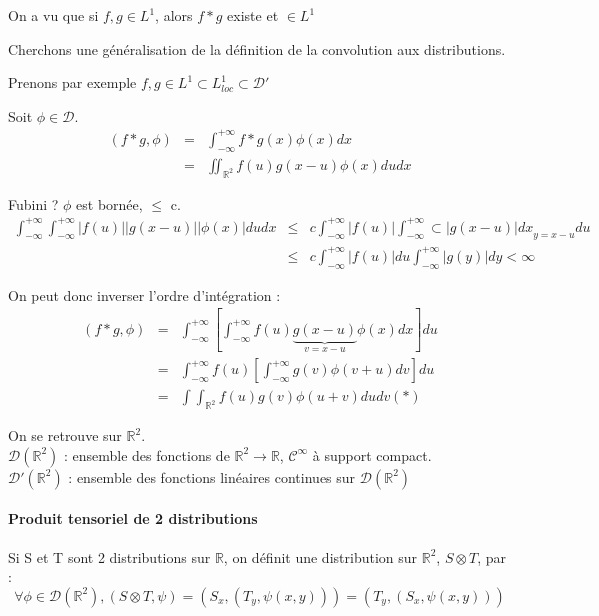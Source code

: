 \documentclass{article}
\begin{document}
On a vu que si $f,g\in L^1$, alors $f*g$ existe et $\in L^1$

Cherchons une généralisation de la définition de la convolution aux distributions.

Prenons par exemple $f,g\in L^1\subset L^1_{loc} \subset \mathcal{D}'$

Soit $\phi\in\mathcal{D}$.
\begin{eqnarray*}
(f*g,\phi)&=& \int_{-\infty}^{+\infty} f*g(x) \phi(x) dx \\
&=& \iint_{\mathbb{R}^2} f(u) g(x-u) \phi(x) du dx
\end{eqnarray*}

Fubini ? $\phi$ est bornée, $\leq$ c.
\begin{eqnarray*}
\int_{-\infty}^{+\infty}\int_{-\infty}^{+\infty} |f(u)||g(x-u)||\phi(x)| du dx &\leq& c \int_{-\infty}^{+\infty} |f(u)| \int_{-\infty}^{+\infty} \subset{|g(x-u)| dx}_{y=x-u} du \\
&\leq& c \int_{-\infty}^{+\infty} |f(u)| du \int_{-\infty}^{+\infty} |g(y)| dy <\infty
\end{eqnarray*}

On peut donc inverser l'ordre d'intégration : 
\begin{eqnarray*}
(f*g,\phi) &=& \int_{-\infty}^{+\infty} \left[\int_{-\infty}^{+\infty} f(u) \underbrace{g(x-u)}_{v=x-u} \phi(x) dx\right] du \\
&=& \int_{-\infty}^{+\infty} f(u) \left[ \int_{-\infty}^{+\infty} g(v) \phi(v+u) dv \right] du \\
&=& \int \int_{\mathbb{R}^2} f(u) g(v) \phi(u+v) du dv (*)
\end{eqnarray*}

On se retrouve sur $\mathbb{R}^2$. \\
$\mathcal{D}(\mathbb{R}^2)$ : ensemble des fonctions de $\mathbb{R}^2 \to \mathbb{R}$, $\mathcal{C}^{\infty}$ à support compact. \\
$\mathcal{D}'(\mathbb{R}^2)$ : ensemble des fonctions linéaires continues sur $\mathcal{D}(\mathbb{R}^2)$

\paragraph{Produit tensoriel de 2 distributions \\}
Si S et T sont 2 distributions sur $\mathbb{R}$, on définit une distribution sur $\mathbb{R}^2$, $S\otimes T$, par :
\[\forall \phi \in \mathcal{D}(\mathbb{R}^2), (S\otimes T,\psi)=(S_x,(T_y,\psi(x,y))) = (T_y,(S_x,\psi(x,y)))\]
\end{document}
